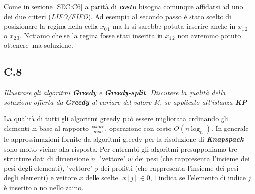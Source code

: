 \documentclass[a4paper]{article}
\newcommand{\imp}[1]{\textbf{\textit{#1}}}
\begin{document}
Come in sezione \ref{SEC:C6} a parità di \imp{costo} bisogna comunque affidarsi ad uno dei due criteri (\textit{LIFO/FIFO}).
Ad esempio al secondo passo è stato scelto di posizionare la regina nella cella $x_{0 \, 1}$ ma la si sarebbe potuta inserire anche in $x_{1 \, 2}$ o $x_{2 \, 3}$.
Notiamo che se la regina fosse stati inserita in $x_{1 \, 2}$ non avremmo potuto ottenere una soluzione. 
\subsection{C.8}
\emph{Illustrare gli algoritmi \textbf{Greedy} e \textbf{Greedy-split}. Discutere la qualità della soluzione offerta da \textbf{Greedy} al variare del valore M, se applicato all'istanza \textbf{KP}}


La qualità di tutti gli algoritmi greedy può essere migliorata ordinando gli elementi in base al rapporto $\frac{valore}{peso}$, operazione con costo $O(n\log_n)$.
In generale le approssimazioni fornite da algoritmi greedy per la risoluzione di \imp{Knapspack} sono molto vicine alla risposta. %
Per entrambi gli algoritmi presupponiamo tre strutture dati di dimensione $n$, "vettore" $w$ dei pesi (che rappresenta l'insieme dei pesi degli elementi), "vettore" $p$ dei profitti  (che rappresenta l'insieme dei pesi degli elementi) e vettore $x$ delle scelte. $x[j] \in {0,1}$ indica se l'elemento di indice $j$ è inserito o no nello zaino.
\end{document}
